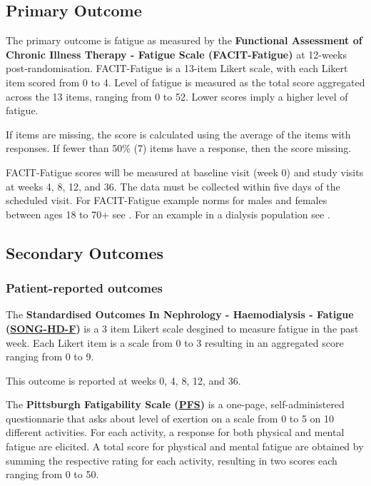 \documentclass[11pt,parskip=half-]{scrartcl}
\begin{document}
\subsection{Primary Outcome}\label{primary-outcome}

The primary outcome is fatigue as measured by the \textbf{Functional Assessment of Chronic Illness Therapy - Fatigue Scale (FACIT-Fatigue)} \cites{yellen1997measuring}{cella2002fatigue} at 12-weeks post-randomisation. FACIT-Fatigue is a 13-item Likert scale, with each Likert item scored from 0 to 4. Level of fatigue is measured as the total score aggregated across the 13 items, ranging from 0 to 52. Lower scores imply a higher level of fatigue.

If items are missing, the score is calculated using the average of the items with responses. If fewer than 50\% (7) items have a response, then the score missing.

FACIT-Fatigue scores will be measured at baseline visit (week 0) and study visits at weeks 4, 8, 12, and 36. The data must be collected within five days of the scheduled visit. For FACIT-Fatigue example norms for males and females between ages 18 to 70+ see \cite{montan2018general}. For an example in a dialysis population see \cite{wang2015psychometric}.

\subsection{Secondary Outcomes}\label{secondary-outcomes}

\subsubsection{Patient-reported outcomes}\label{pro-outcomes}

\label{outcome:song-hd-f}
The \textbf{Standardised Outcomes In Nephrology - Haemodialysis - Fatigue (\hyperref[analysis:song-hd-f]{SONG-HD-F})} \cite{ju2018establishing} is a 3 item Likert scale desgined to measure fatigue in the past week. Each Likert item is a scale from 0 to 3 resulting in an aggregated score ranging from 0 to 9.

This outcome is reported at weeks 0, 4, 8, 12, and 36.

\label{outcome:pfs}
The \textbf{Pittsburgh Fatigability Scale (\hyperref[analysis:pfs]{PFS})} \cite{glynn2015pittsburgh} is a one-page, self-administered questionnarie that asks about level of exertion on a scale from 0 to 5 on 10 different activities. For each activity, a response for both physical and mental fatigue are elicited. A total score for phystical and mental fatigue are obtained by summing the respective rating for each activity, resulting in two scores each ranging from 0 to 50.
\end{document}
